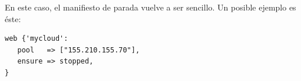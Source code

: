 En este caso, el manifiesto de parada vuelve a ser sencillo. Un posible ejemplo es éste:

\begin{lstlisting}
web {'mycloud':
   pool   => ["155.210.155.70"],
   ensure => stopped,
}
\end{lstlisting}



